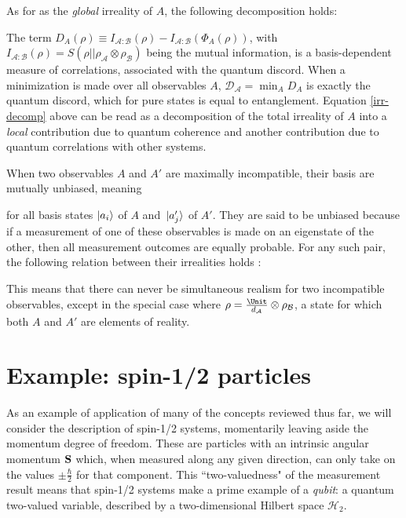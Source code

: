 \documentclass[12pt,a4paper,notitlepage]{report}
\begin{document}
As for as the {\it global} irreality of $A$, the following decomposition holds:

%
The term $D_A(\rho) \equiv I_{\mathcal{A}:\mathcal{B}}(\rho) - I_{\mathcal{A}:\mathcal{B}}(\Phi_A(\rho))$, with $I_{\mathcal{A}:\mathcal{B}}(\rho) = S(\rho || \rho_{\mathcal{A}} \otimes \rho_{\mathcal{B}})$ being the mutual information, is a basis-dependent measure of correlations, associated with the quantum discord\cite{ollivier_zurek_2001, henderson_vedral_2001, rulli_sarandy_2011}. When a minimization is made over all observables $A$, $\mathcal{D}_{\mathcal{A}} = \min_A D_A$ is exactly the quantum discord, which for pure states is equal to entanglement. Equation \eqref{irr-decomp} above can be read as a decomposition of the total irreality of $A$ into a {\it local} contribution due to quantum coherence and another contribution due to quantum correlations with other systems.

When two observables $A$ and $A'$ are maximally incompatible, their basis are mutually unbiased, meaning

for all basis states $\ket{a_i}$ of $A$ and $\ket*{a'_j}$ of $A'$. They are said to be unbiased because if a measurement of one of these observables is made on an eigenstate of the other, then all measurement outcomes are equally probable. For any such pair, the following relation between their irrealities holds \cite{freire_angelo_2019}:

%
This means that there can never be simultaneous realism for two incompatible observables, except in the special case where $\rho = \tfrac{\Unit}{d_{\mathcal{A}}} \otimes \rho_{\mathcal{B}}$, a state for which both $A$ and $A'$ are elements of reality.


\section{Example: spin-1/2 particles}
\label{stern-gerlach}

As an example of application of many of the concepts reviewed thus far, we will consider the description of spin-1/2 systems, momentarily leaving aside the momentum degree of freedom. These are particles with an intrinsic angular momentum $\vb{S}$ which, when measured along any given direction, can only take on the values $\pm\frac{\hbar}{2}$ for that component. This ``two-valuedness" of the measurement result means that spin-1/2 systems make a prime example of a {\it qubit}: a quantum two-valued variable, described by a two-dimensional Hilbert space $\mathcal{H}_2$.
\end{document}
